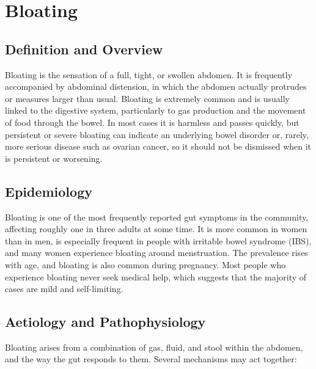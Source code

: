 \chapter{Bloating}

\section*{Definition and Overview}
Bloating is the sensation of a full, tight, or swollen abdomen. It is frequently accompanied by abdominal distension, in which the abdomen actually protrudes or measures larger than usual. Bloating is extremely common and is usually linked to the digestive system, particularly to gas production and the movement of food through the bowel. In most cases it is harmless and passes quickly, but persistent or severe bloating can indicate an underlying bowel disorder or, rarely, more serious disease such as ovarian cancer, so it should not be dismissed when it is persistent or worsening.

\section*{Epidemiology}
Bloating is one of the most frequently reported gut symptoms in the community, affecting roughly one in three adults at some time. It is more common in women than in men, is especially frequent in people with irritable bowel syndrome (IBS), and many women experience bloating around menstruation. The prevalence rises with age, and bloating is also common during pregnancy. Most people who experience bloating never seek medical help, which suggests that the majority of cases are mild and self-limiting.

\section*{Aetiology and Pathophysiology}
Bloating arises from a combination of gas, fluid, and stool within the abdomen, and the way the gut responds to them. Several mechanisms may act together:

